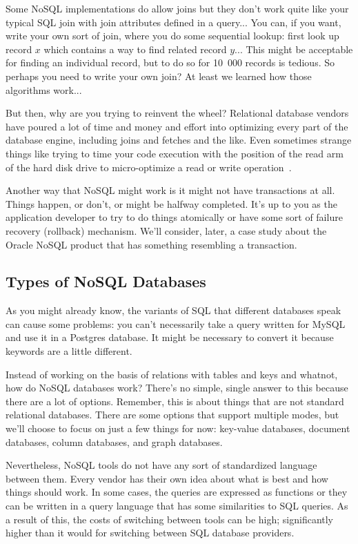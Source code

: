 \documentclass[a4paper]{report}
\begin{document}
Some NoSQL implementations do allow joins but they don't work quite like your typical SQL join with join attributes defined in a query... You can, if you want, write your own sort of join, where you do some sequential lookup: first look up record $x$ which contains a way to find related record $y$... This might be acceptable for finding an individual record, but to do so for 10~000 records is tedious. So perhaps you need to write your own join? At least we learned how those algorithms work... 

But then, why are you trying to reinvent the wheel? Relational database vendors have poured a lot of time and money and effort into optimizing every part of the database engine, including joins and fetches and the like. Even sometimes strange things like trying to time your code execution with the position of the read arm of the hard disk drive to micro-optimize a read or write operation~\cite{nosql}. 

Another way that NoSQL might work is it might not have transactions at all. Things happen, or don't, or might be halfway completed. It's up to you as the application developer to try to do things atomically or have some sort of failure recovery (rollback) mechanism. We'll consider, later, a case study about the Oracle NoSQL product that has something resembling a transaction.

\subsection*{Types of NoSQL Databases}

As you might already know, the variants of SQL that different databases speak can cause some problems: you can't necessarily take a query written for MySQL and use it in a Postgres database. It might be necessary to convert it because keywords are a little different.

Instead of working on the basis of relations with tables and keys and whatnot, how do NoSQL databases work? There's no simple, single answer to this because there are a lot of options. Remember, this is about things that are not standard relational databases. There are some options that support multiple modes, but we'll choose to focus on just a few things for now: key-value databases, document databases, column databases, and graph databases.

Nevertheless, NoSQL tools do not have any sort of standardized language between them. Every vendor has their own idea about what is best and how things should work. In some cases, the queries are expressed as functions or they can be written in a query language that has some similarities to SQL queries. As a result of this, the costs of switching between tools can be high; significantly higher than it would for switching between SQL database providers.
\end{document}
